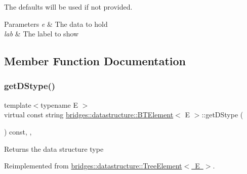 The defaults will be used if not provided.


\begin{DoxyParams}{Parameters}
{\em e} & The data to hold \\
\hline
{\em lab} & The label to show \\
\hline
\end{DoxyParams}


\subsection{Member Function Documentation}
\mbox{\label{classbridges_1_1datastructure_1_1_b_t_element_a2118b6b74f3fe0fec39e3b258a7dee89}} 
\subsubsection{\texorpdfstring{getDStype()}{getDStype()}}
{\footnotesize\ttfamily template$<$typename E $>$ \\
virtual const string \mbox{\hyperlink{classbridges_1_1datastructure_1_1_b_t_element}{bridges\+::datastructure\+::\+B\+T\+Element}}$<$ E $>$\+::get\+D\+Stype (\begin{DoxyParamCaption}{ }\end{DoxyParamCaption}) const\hspace{0.3cm}{\ttfamily [inline]}, {\ttfamily [override]}, {\ttfamily [virtual]}}

\begin{DoxyReturn}{Returns}
the data structure type 
\end{DoxyReturn}


Reimplemented from \mbox{\hyperlink{classbridges_1_1datastructure_1_1_tree_element_a897f34ea284da45e1dc869c3e3b6c9a4}{bridges\+::datastructure\+::\+Tree\+Element$<$ E $>$}}.

\mbox{\label{classbridges_1_1datastructure_1_1_b_t_element_aaa551a4f24bb7ed63fd39e9c4153402b}} 
